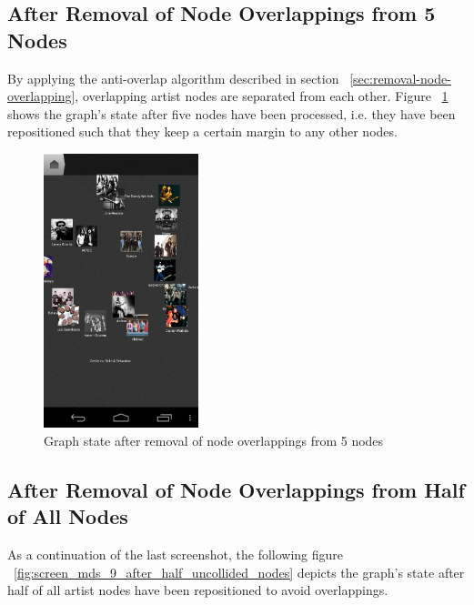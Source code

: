 \newpage
\subsection{After Removal of Node Overlappings from 5 Nodes}

By applying the anti-overlap algorithm described in section ~\ref{sec:removal-node-overlapping}, overlapping artist nodes are separated from each other. Figure ~\ref{fig:screen_mds_8_after_5_uncollided_nodes} shows the graph's state after five nodes have been processed, i.e. they have been repositioned such that they keep a certain margin to any other nodes.

\begin{figure}[H]
  \centering
    \includegraphics[width=0.4\textwidth]{figures/screen_mds_8_after_5_uncollided_nodes}
  \caption{Graph state after removal of node overlappings from 5 nodes}
  \label{fig:screen_mds_8_after_5_uncollided_nodes}
\end{figure}

\newpage
\subsection{After Removal of Node Overlappings from Half of All Nodes}

As a continuation of the last screenshot, the following figure ~\ref{fig:screen_mds_9_after_half_uncollided_nodes} depicts the graph's state after half of all artist nodes have been repositioned to avoid overlappings.

